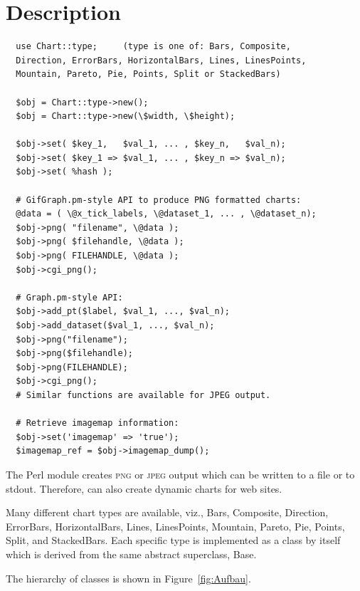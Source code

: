 \clearpage
\section{Description}
\synopsis

\begin{verbatim}
  use Chart::type;     (type is one of: Bars, Composite,
  Direction, ErrorBars, HorizontalBars, Lines, LinesPoints,
  Mountain, Pareto, Pie, Points, Split or StackedBars)

  $obj = Chart::type->new();
  $obj = Chart::type->new(\$width, \$height);

  $obj->set( $key_1,   $val_1, ... , $key_n,   $val_n);
  $obj->set( $key_1 => $val_1, ... , $key_n => $val_n);
  $obj->set( %hash );

  # GifGraph.pm-style API to produce PNG formatted charts:
  @data = ( \@x_tick_labels, \@dataset_1, ... , \@dataset_n);
  $obj->png( "filename", \@data );
  $obj->png( $filehandle, \@data );
  $obj->png( FILEHANDLE, \@data );
  $obj->cgi_png();

  # Graph.pm-style API:
  $obj->add_pt($label, $val_1, ..., $val_n);
  $obj->add_dataset($val_1, ..., $val_n);
  $obj->png("filename");
  $obj->png($filehandle);
  $obj->png(FILEHANDLE);
  $obj->cgi_png();
  # Similar functions are available for JPEG output.

  # Retrieve imagemap information:
  $obj->set('imagemap' => 'true');
  $imagemap_ref = $obj->imagemap_dump();

\end{verbatim}
\clearpage

The Perl module  creates \textsc{png} or \textsc{jpeg}
output which can be written to a file or to stdout. Therefore,
 can also create dynamic charts for web sites.

Many different chart types are available, viz., Bars,
Composite, Direction, ErrorBars, HorizontalBars, Lines, LinesPoints,
Mountain, Pareto, Pie, Points, Split, and StackedBars. Each
specific type is implemented as a class by itself which is
derived from the same abstract superclass, Base.

The hierarchy of  classes is shown in
Figure~\ref{fig:Aufbau}.

